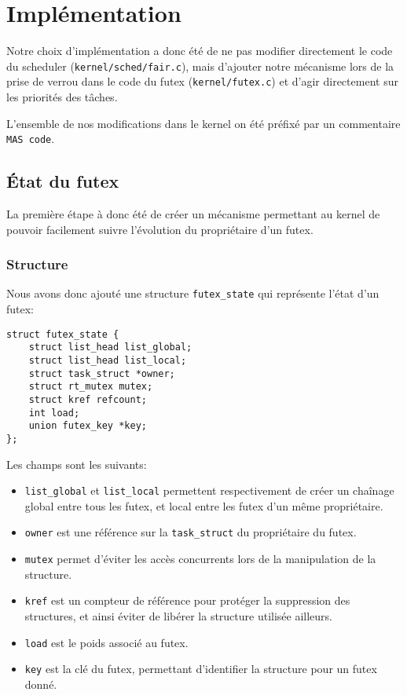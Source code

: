 \section{Implémentation}

Notre choix d'implémentation a donc été de ne pas modifier directement le code du scheduler (\verb|kernel/sched/fair.c|), mais d'ajouter notre mécanisme lors de la prise de
verrou dans le code
du futex (\verb|kernel/futex.c|) et d'agir directement sur les priorités des tâches.

L'ensemble de nos modifications dans le kernel on été préfixé par un commentaire \verb|MAS code|.

\subsection{État du futex}

La première étape à donc été de créer un mécanisme permettant au kernel de pouvoir facilement
suivre l'évolution du propriétaire d'un futex.

\subsubsection{Structure}

Nous avons donc ajouté une structure \verb|futex_state| qui représente l'état d'un
futex:

\begin{lstlisting}
struct futex_state {
	struct list_head list_global;
	struct list_head list_local;
	struct task_struct *owner;
	struct rt_mutex mutex;
	struct kref refcount;
	int load;
	union futex_key *key;
};
\end{lstlisting}

Les champs sont les suivants:
\begin{itemize}
	\item \verb|list_global| et \verb|list_local| permettent respectivement de
	créer un chaînage global entre tous les futex, et local entre les futex d'un même
	propriétaire.
	\item \verb|owner| est une référence sur la \verb|task_struct| du propriétaire du futex.
	
	\item \verb|mutex| permet d'éviter les accès concurrents lors de la manipulation de
	la structure.
	
	\item \verb|kref| est un compteur de référence pour protéger la suppression
	des structures, et ainsi éviter de libérer la structure utilisée ailleurs.
	
	\item \verb|load| est le poids associé au futex.
	
	\item \verb|key| est la clé du futex, permettant d'identifier la structure pour un 
	futex donné.
\end{itemize}
\hspace{1cm}

